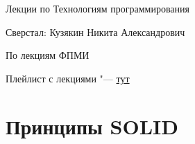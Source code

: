 \documentclass[bachelor, och, pract]{SCWorks}
\theoremstyle{remark}
\begin{document}
    \hfill \break
    \hfill \break
    \hfill \break
    \hfill \break
    \hfill \break
    \hfill \break
    \hfill \break
    \hfill \break
    \hfill \break
    \hfill \break
    \hfill \break
    \hfill \break
    \begin{center}
        \Huge Лекции по Технологиям программирования
    \end{center}
    \hfill \break
    \hfill \break
    \hfill \break
    \hfill \break
    \hfill \break
    \hfill \break
    \hfill \break
    \hfill \break
    \hfill \break

    \begin{center} Сверстал: Кузякин Никита Александрович \end{center}
    \begin{center} По лекциям ФПМИ \end{center}
    \begin{center}Плейлист с лекциями "--- \href{https://www.youtube.com/watch?v=XjGbg-N4sQc&list=PL4_hYwCyhAvaTVSzXsvFQlb-FmNqUNkPT}{тут}\end{center}
    \thispagestyle{empty} %
     
    \newpage
    \tableofcontents

    \section{Принципы SOLID}
    
\end{document}
